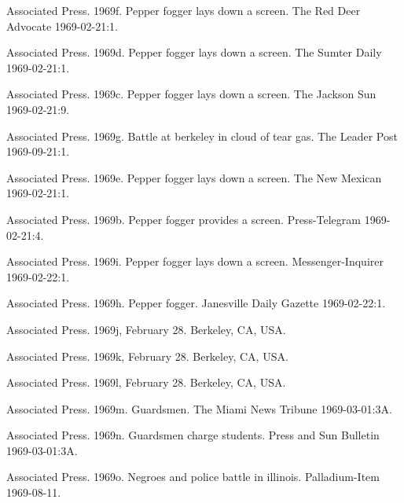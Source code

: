 \documentclass[
  11pt,
]{krantz}
\newlength{\cslhangindent}
\newlength{\cslentryspacingunit} %
\newenvironment{CSLReferences}[2] %
 {%
  \setlength{\parindent}{0pt}
  \ifodd #1
  \let\oldpar\par
  \def\par{\hangindent=\cslhangindent\oldpar}
  \fi
  \setlength{\parskip}{#2\cslentryspacingunit}
 }%
 {}
\begin{document}
\begin{CSLReferences}{1}{0}
\leavevmode{}%
Associated Press. 1969f. Pepper fogger lays down a screen. The Red Deer Advocate 1969-02-21:1.

\leavevmode{}%
Associated Press. 1969d. Pepper fogger lays down a screen. The Sumter Daily 1969-02-21:1.

\leavevmode{}%
Associated Press. 1969c. Pepper fogger lays down a screen. The Jackson Sun 1969-02-21:9.

\leavevmode{}%
Associated Press. 1969g. Battle at berkeley in cloud of tear gas. The Leader Post 1969-09-21:1.

\leavevmode{}%
Associated Press. 1969e. Pepper fogger lays down a screen. The New Mexican 1969-02-21:1.

\leavevmode{}%
Associated Press. 1969b. Pepper fogger provides a screen. Press-Telegram 1969-02-21:4.

\leavevmode{}%
Associated Press. 1969i. Pepper fogger lays down a screen. Messenger-Inquirer 1969-02-22:1.

\leavevmode{}%
Associated Press. 1969h. Pepper fogger. Janesville Daily Gazette 1969-02-22:1.

\leavevmode{}%
Associated Press. 1969j, February 28. Berkeley, CA, USA.

\leavevmode{}%
Associated Press. 1969k, February 28. Berkeley, CA, USA.

\leavevmode{}%
Associated Press. 1969l, February 28. Berkeley, CA, USA.

\leavevmode{}%
Associated Press. 1969m. Guardsmen. The Miami News Tribune 1969-03-01:3A.

\leavevmode{}%
Associated Press. 1969n. Guardsmen charge students. Press and Sun Bulletin 1969-03-01:3A.

\leavevmode{}%
Associated Press. 1969o. Negroes and police battle in illinois. Palladium-Item 1969-08-11.


\end{CSLReferences}
\end{document}
